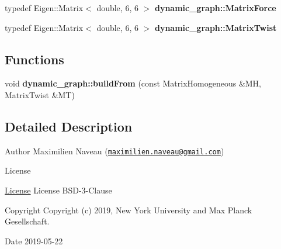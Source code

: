 \begin{DoxyCompactItemize}
\item 
typedef Eigen\+::\+Matrix$<$ double, 6, 6 $>$ {\bfseries dynamic\+\_\+graph\+::\+Matrix\+Force}\hypertarget{namespacedynamic__graph_a43b4e15f6e943f7208372fd22ea108eb}{}\label{namespacedynamic__graph_a43b4e15f6e943f7208372fd22ea108eb}

\item 
typedef Eigen\+::\+Matrix$<$ double, 6, 6 $>$ {\bfseries dynamic\+\_\+graph\+::\+Matrix\+Twist}\hypertarget{namespacedynamic__graph_a933ba3678a5e0b14430acd27709cdf47}{}\label{namespacedynamic__graph_a933ba3678a5e0b14430acd27709cdf47}

\end{DoxyCompactItemize}
\subsection*{Functions}
\begin{DoxyCompactItemize}
\item 
void {\bfseries dynamic\+\_\+graph\+::build\+From} (const Matrix\+Homogeneous \&MH, Matrix\+Twist \&MT)\hypertarget{namespacedynamic__graph_a8023711282c3d038a68202b12d5279d6}{}\label{namespacedynamic__graph_a8023711282c3d038a68202b12d5279d6}

\end{DoxyCompactItemize}


\subsection{Detailed Description}
\begin{DoxyAuthor}{Author}
Maximilien Naveau (\href{mailto:maximilien.naveau@gmail.com}{\tt maximilien.\+naveau@gmail.\+com}) 
\end{DoxyAuthor}
\begin{DoxyRefDesc}{License}
\item[\hyperlink{license__license000020}{License}]License B\+S\+D-\/3-\/\+Clause \end{DoxyRefDesc}
\begin{DoxyCopyright}{Copyright}
Copyright (c) 2019, New York University and Max Planck Gesellschaft. 
\end{DoxyCopyright}
\begin{DoxyDate}{Date}
2019-\/05-\/22 
\end{DoxyDate}
